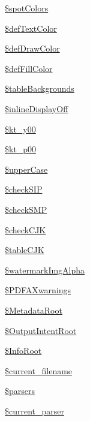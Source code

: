 \begin{DoxyCompactItemize}
\item 
\hyperlink{classm_p_d_f_a51de96baebc003b95bf9ec71c5722a35}{\$spot\-Colors}
\item 
\hyperlink{classm_p_d_f_ad77ba75ba501ac80594f39b54f32c8c3}{\$def\-Text\-Color}
\item 
\hyperlink{classm_p_d_f_ae689c89f825d2e00977cad05f5708f4c}{\$def\-Draw\-Color}
\item 
\hyperlink{classm_p_d_f_a3add912a90adf5c26da623acca404a0d}{\$def\-Fill\-Color}
\item 
\hyperlink{classm_p_d_f_a787126423db99f5e5c94a4f173647df5}{\$table\-Backgrounds}
\item 
\hyperlink{classm_p_d_f_a240d08fa5b6f5cd83646757d855d959a}{\$inline\-Display\-Off}
\item 
\hyperlink{classm_p_d_f_a5dd273db4eed089cba6c73cf0540ae8b}{\$kt\-\_\-y00}
\item 
\hyperlink{classm_p_d_f_a138f0ae6aa151267e48cc91f92e1a165}{\$kt\-\_\-p00}
\item 
\hyperlink{classm_p_d_f_a611bd790ef9378c833499d4cf4801447}{\$upper\-Case}
\item 
\hyperlink{classm_p_d_f_ad8e84e644462e35265f4d79987b82a45}{\$check\-S\-I\-P}
\item 
\hyperlink{classm_p_d_f_a01affc751cbe9be5b0fb3c6cee4f85db}{\$check\-S\-M\-P}
\item 
\hyperlink{classm_p_d_f_a918dcc6948cf6d2b89de9f7d5c266325}{\$check\-C\-J\-K}
\item 
\hyperlink{classm_p_d_f_ab6f6ee7065eda3130c3726fbd198f5f1}{\$table\-C\-J\-K}
\item 
\hyperlink{classm_p_d_f_aa8a63329484ba1a8353c4d7c9bece522}{\$watermark\-Img\-Alpha}
\item 
\hyperlink{classm_p_d_f_aa664c198e17780a3e4f6ac6414a5bec0}{\$\-P\-D\-F\-A\-Xwarnings}
\item 
\hyperlink{classm_p_d_f_ab39f10c38c429a78a2fb66d8e60c285d}{\$\-Metadata\-Root}
\item 
\hyperlink{classm_p_d_f_aa107caae1812606296893657965b6307}{\$\-Output\-Intent\-Root}
\item 
\hyperlink{classm_p_d_f_ac45bd52cd9f2ff6104a212ddf669129e}{\$\-Info\-Root}
\item 
\hyperlink{classm_p_d_f_a12df0eaef682a8b25c120daedb22680d}{\$current\-\_\-filename}
\item 
\hyperlink{classm_p_d_f_a29a1f946c020074761ba32668ea90636}{\$parsers}
\item 
\hyperlink{classm_p_d_f_a61b62e74151443b1071feab3fe4b7579}{\$current\-\_\-parser}

\end{DoxyCompactItemize}
